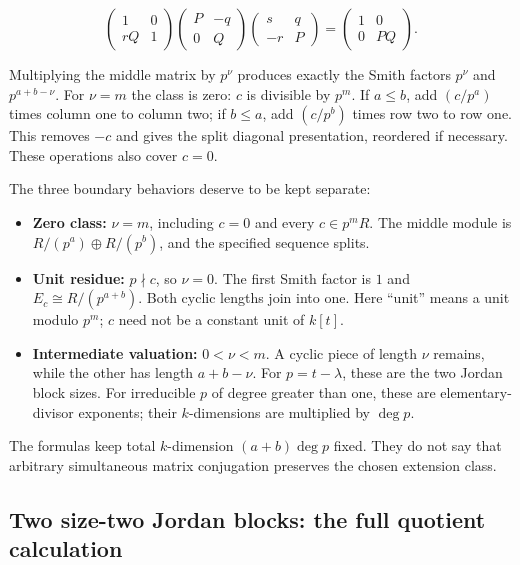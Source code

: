 \documentclass[
  11pt,
]{article}
\providecommand{\tightlist}{%
  \setlength{\itemsep}{0pt}\setlength{\parskip}{0pt}}
\begin{document}
\[\begin{pmatrix}1&0\\rQ&1\end{pmatrix}
\begin{pmatrix}P&-q\\0&Q\end{pmatrix}
\begin{pmatrix}s&q\\-r&P\end{pmatrix}
=\begin{pmatrix}1&0\\0&PQ\end{pmatrix}.\tag{35}\]

Multiplying the middle matrix by \(p^\nu\) produces exactly the Smith
factors \(p^\nu\) and \(p^{a+b-\nu}\). For \(\nu=m\) the class is zero:
\(c\) is divisible by \(p^m\). If \(a\le b\), add \((c/p^a)\) times
column one to column two; if \(b\le a\), add \((c/p^b)\) times row two
to row one. This removes \(-c\) and gives the split diagonal
presentation, reordered if necessary. These operations also cover
\(c=0\).

The three boundary behaviors deserve to be kept separate:

\begin{itemize}
\tightlist
\item
  \textbf{Zero class:} \(\nu=m\), including \(c=0\) and every
  \(c\in p^mR\). The middle module is \(R/(p^a)\oplus R/(p^b)\), and the
  specified sequence splits.
\item
  \textbf{Unit residue:} \(p\nmid c\), so \(\nu=0\). The first Smith
  factor is \(1\) and \(E_c\cong R/(p^{a+b})\). Both cyclic lengths join
  into one. Here ``unit'' means a unit modulo \(p^m\); \(c\) need not be
  a constant unit of \(k[t]\).
\item
  \textbf{Intermediate valuation:} \(0<\nu<m\). A cyclic piece of length
  \(\nu\) remains, while the other has length \(a+b-\nu\). For
  \(p=t-\lambda\), these are the two Jordan block sizes. For irreducible
  \(p\) of degree greater than one, these are elementary-divisor
  exponents; their \(k\)-dimensions are multiplied by \(\deg p\).
\end{itemize}

The formulas keep total \(k\)-dimension \((a+b)\deg p\) fixed. They do
not say that arbitrary simultaneous matrix conjugation preserves the
chosen extension class.

\subsection{Two size-two Jordan blocks: the full quotient
calculation}\label{two-size-two-jordan-blocks-the-full-quotient-calculation}
\end{document}
